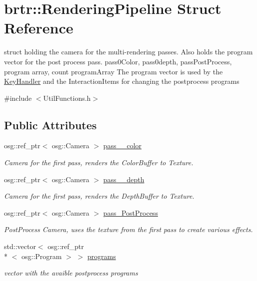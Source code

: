 \hypertarget{structbrtr_1_1_rendering_pipeline}{\section{brtr\+:\+:Rendering\+Pipeline Struct Reference}
\label{structbrtr_1_1_rendering_pipeline}
}


struct holding the camera for the multi-\/rendering passes. Also holds the program vector for the post process pass. pass0\+Color, pass0depth, pass\+Post\+Process, program array, count program\+Array The program vector is used by the \hyperlink{classbrtr_1_1_key_handler}{Key\+Handler} and the Interaction\+Items for changing the postprocess programs  




{\ttfamily \#include $<$Util\+Functions.\+h$>$}

\subsection*{Public Attributes}
\begin{DoxyCompactItemize}
\item 
osg\+::ref\+\_\+ptr$<$ osg\+::\+Camera $>$ \hyperlink{structbrtr_1_1_rendering_pipeline_ae945030321a6b44f00266954c8c50bf3}{pass\+\_\+\_\+color}
\begin{DoxyCompactList}\small\item\em Camera for the first pass, renders the Color\+Buffer to Texture. \end{DoxyCompactList}\item 
osg\+::ref\+\_\+ptr$<$ osg\+::\+Camera $>$ \hyperlink{structbrtr_1_1_rendering_pipeline_a18752632c1b557d283e523ebbc0443a0}{pass\+\_\+\_\+depth}
\begin{DoxyCompactList}\small\item\em Camera for the first pass, renders the Depth\+Buffer to Texture. \end{DoxyCompactList}\item 
osg\+::ref\+\_\+ptr$<$ osg\+::\+Camera $>$ \hyperlink{structbrtr_1_1_rendering_pipeline_aea2228e41f1e5c6db5d616c05ecc27fd}{pass\+\_\+\+Post\+Process}
\begin{DoxyCompactList}\small\item\em Post\+Process Camera, uses the texture from the first pass to create various effects. \end{DoxyCompactList}\item 
std\+::vector$<$ osg\+::ref\+\_\+ptr\\*
$<$ osg\+::\+Program $>$ $>$ \hyperlink{structbrtr_1_1_rendering_pipeline_afe773fb98986d39ef23a4edf3634af10}{programs}
\begin{DoxyCompactList}\small\item\em vector with the avaible postprocess programs \end{DoxyCompactList}\end{DoxyCompactItemize}


